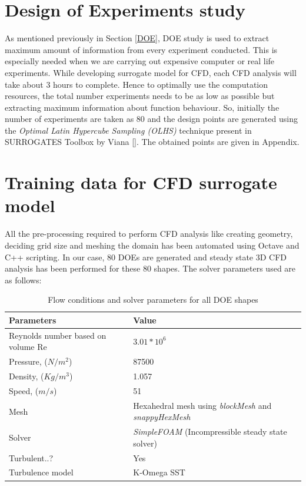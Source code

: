 \section{Design of Experiments study}

As mentioned previously in Section \ref{DOE}, DOE study is used to extract maximum amount of information from every experiment conducted. This is especially needed when we are carrying out expensive computer or real life experiments. While developing surrogate model for CFD, each CFD analysis will take about 3 hours to complete. Hence to optimally use the computation resources, the total number experiments needs to be as low as possible but extracting maximum information about function behaviour. So, initially the number of experiments are taken as 80 and the design points are generated using the \textit{Optimal Latin Hypercube Sampling (OLHS)} technique present in SURROGATES Toolbox by Viana []. The obtained points are given in Appendix.


\section{Training data for CFD surrogate model}
\label{Training data CFD}
All the pre-processing required to perform CFD analysis like creating geometry, deciding grid size and meshing the domain has been automated using Octave and C++ scripting. In our case, 80 DOEs are generated and steady state 3D CFD analysis has been performed for these 80 shapes. The solver parameters used are as follows:
\begin{table}[H]
	\caption{Flow conditions and solver parameters for all DOE shapes}
	\label{Flow conditions and solver parametres for all DOE shapes}
	\centering
	\begin{tabular}{ll}
		\hline \hline
		Parameters & Value \\ 
		\hline \hline
		Reynolds number based on volume Re & $ 3.01 \ast 10^6 $ \\
		Pressure, ($ N/m^2 $) & 87500 \\
		Density, ($ Kg/m^3 $) & 1.057 \\
		Speed, ($ m/s $) & 51 \\
		Mesh & Hexahedral mesh using \textit{blockMesh} and \textit{snappyHexMesh} \\
		Solver & \textit{SimpleFOAM} (Incompressible steady state solver) \\
		Turbulent..? & Yes \\
		Turbulence model & K-Omega SST \\
		\hline \hline
	\end{tabular}
\end{table}

